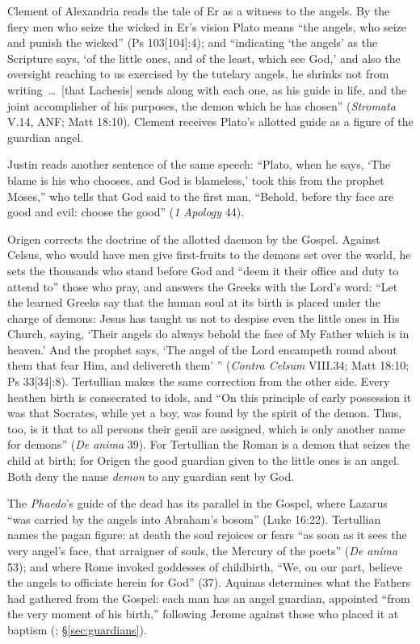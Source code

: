 Clement of Alexandria reads the tale of Er as a witness to the angels.
By the fiery men who seize the wicked in Er's vision Plato means ``the
angels, who seize and punish the wicked'' (Ps 103[104]:4); and
``indicating `the angels' as the Scripture says, `of the little ones,
and of the least, which see God,' and also the oversight reaching to us
exercised by the tutelary angels, he shrinks not from writing~\dots\ [that Lachesis] sends along with each one, as his guide in life, and the
joint accomplisher of his purposes, the demon which he has chosen''
(\emph{Stromata} V.14, ANF; Matt 18:10). Clement receives Plato's
allotted guide as a figure of the guardian angel.

Justin reads another sentence of the same speech: ``Plato, when he
says, `The blame is his who chooses, and God is blameless,' took this
from the prophet Moses,'' who tells that God said to the first man,
``Behold, before thy face are good and evil: choose the good''
(\emph{1 Apology} 44).

Origen corrects the doctrine of the allotted daemon by the Gospel.
Against Celsus, who would have men give first-fruits to the demons set
over the world, he sets the thousands who stand before God and ``deem
it their office and duty to attend to'' those who pray, and answers the
Greeks with the Lord's word: ``Let the learned Greeks say that the human
soul at its birth is placed under the charge of demons: Jesus has taught
us not to despise even the little ones in His Church, saying, `Their
angels do always behold the face of My Father which is in heaven.' And
the prophet says, `The angel of the Lord encampeth round about them that
fear Him, and delivereth them' '' (\emph{Contra Celsum} VIII.34; Matt
18:10; Ps 33[34]:8). Tertullian makes the same correction from the
other side. Every heathen birth is consecrated to idols, and ``On this
principle of early possession it was that Socrates, while yet a boy, was
found by the spirit of the demon. Thus, too, is it that to all persons
their genii are assigned, which is only another name for demons''
(\emph{De anima} 39). For Tertullian the Roman  is a demon
that seizes the child at birth; for Origen the good guardian given to
the little ones is an angel. Both deny the name \emph{demon} to any
guardian sent by God.

The \emph{Phaedo}'s guide of the dead has its parallel in the Gospel,
where Lazarus ``was carried by the angels into Abraham's bosom'' (Luke
16:22). Tertullian names the pagan figure: at death the soul rejoices or
fears ``as soon as it sees the very angel's face, that arraigner of
souls, the Mercury of the poets'' (\emph{De anima} 53); and where Rome
invoked goddesses of childbirth, ``We, on our part, believe the angels
to officiate herein for God'' (37). Aquinas determines what the Fathers
had gathered from the Gospel: each man has an angel guardian, appointed
``from the very moment of his birth,'' following Jerome against those
who placed it at baptism (;
\S\ref{sec:guardians}).

